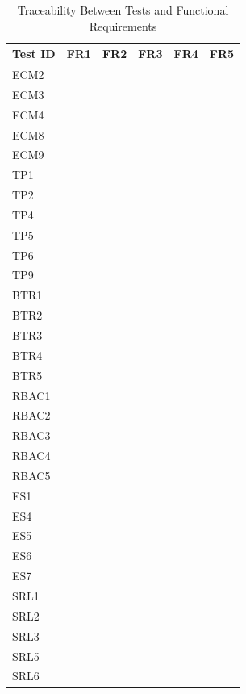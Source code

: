 \documentclass[12pt, titlepage]{article}
\newcommand{\cmark}{\checkmark}
\begin{document}
\begin{table}[p]
\centering
\caption{Traceability Between Tests and Functional Requirements}
\label{tab:reqtrace}
\scriptsize
\setlength{\tabcolsep}{10pt}
\renewcommand{\arraystretch}{1.2}
\begin{tabular}{@{}l *{5}{c}@{}}
\toprule
\textbf{Test ID} & \textbf{FR1} & \textbf{FR2} & \textbf{FR3} & \textbf{FR4} & \textbf{FR5} \\
\midrule
ECM2 &  &  &  &  & \cmark \\
ECM3 &  &  &  &  & \cmark \\
ECM4 &  &  &  &  & \cmark \\
ECM8 &  & \cmark &  &  & \cmark \\
ECM9 &  &  &  &  & \cmark \\
TP1  & \cmark &  &  &  &  \\
TP2  & \cmark &  &  &  &  \\
TP4  & \cmark &  &  &  &  \\
TP5  & \cmark &  &  &  &  \\
TP6  & \cmark &  &  &  &  \\
TP9  & \cmark &  &  &  &  \\
BTR1 &  & \cmark &  &  & \cmark \\
BTR2 &  & \cmark &  &  & \cmark \\
BTR3 &  & \cmark &  &  &  \\
BTR4 &  & \cmark &  &  &  \\
BTR5 &  & \cmark &  &  &  \\
RBAC1 &  &  &  & \cmark & \cmark \\
RBAC2 &  &  &  & \cmark &  \\
RBAC3 & \cmark &  &  & \cmark &  \\
RBAC4 & \cmark &  &  & \cmark &  \\
RBAC5 &  &  &  & \cmark &  \\
\midrule
ES1  & \cmark &  &  &  &  \\
ES4  & \cmark & \cmark &  &  &  \\
ES5  & \cmark & \cmark &  &  &  \\
ES6  &  & \cmark &  &  &  \\
ES7  & \cmark &  &  &  &  \\
SRL1 & \cmark & \cmark &  &  &  \\
SRL2 & \cmark &  &  &  &  \\
SRL3 & \cmark &  &  &  &  \\
SRL5 & \cmark & \cmark &  &  &  \\
SRL6 & \cmark &  &  &  &  \\
\bottomrule
\end{tabular}
\end{table}
\end{document}
